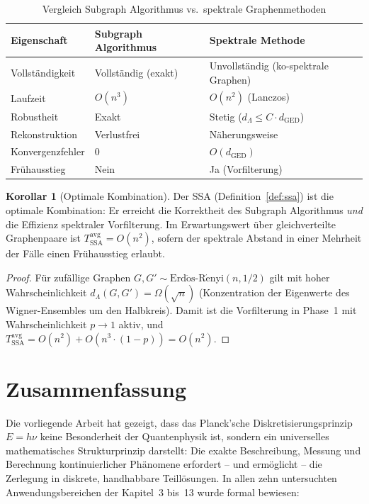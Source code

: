 ﻿\documentclass[a4paper,12pt]{article}
\theoremstyle{definition}
\newtheorem{korollar}{Korollar}
\begin{document}
\begin{table}[ht]
\centering
\begin{tabular}{lll}
\toprule
\textbf{Eigenschaft} & \textbf{Subgraph Algorithmus} & \textbf{Spektrale Methode}\\
\midrule
Vollständigkeit & Vollständig (exakt) & Unvollständig (ko-spektrale Graphen)\\
Laufzeit & $O(n^3)$ & $O(n^2)$ (Lanczos)\\
Robustheit & Exakt & Stetig ($d_\Lambda \leq C \cdot d_{\mathrm{GED}}$)\\
Rekonstruktion & Verlustfrei & Näherungsweise\\
Konvergenzfehler & 0 & $O(d_{\mathrm{GED}})$\\
Frühausstieg & Nein & Ja (Vorfilterung)\\
\bottomrule
\end{tabular}
\caption{Vergleich Subgraph Algorithmus vs.\ spektrale Graphenmethoden}
\end{table}

\begin{korollar}[Optimale Kombination]
\label{kor:opt}
    Der SSA (Definition~\ref{def:ssa}) ist die optimale Kombination:
    Er erreicht die Korrektheit des Subgraph Algorithmus \emph{und} die Effizienz
    spektraler Vorfilterung. Im Erwartungswert über gleichverteilte Graphenpaare ist
    $T_{\mathrm{SSA}}^{\mathrm{avg}} = O(n^2)$, sofern der spektrale Abstand in einer Mehrheit
    der Fälle einen Frühausstieg erlaubt.
\end{korollar}

\begin{proof}
    Für zufällige Graphen $G, G' \sim \mathrm{Erd\ddot{o}s\text{-}R\acute{e}nyi}(n, 1/2)$
    gilt mit hoher Wahrscheinlichkeit $d_\Lambda(G, G') = \Omega(\sqrt{n})$
    (Konzentration der Eigenwerte des Wigner-Ensembles um den Halbkreis).
    Damit ist die Vorfilterung in Phase~1 mit Wahrscheinlichkeit $p \to 1$ aktiv,
    und $T_{\mathrm{SSA}}^{\mathrm{avg}} = O(n^2) + O(n^3 \cdot (1-p)) = O(n^2)$. \qedhere
\end{proof}

\section{Zusammenfassung}

Die vorliegende Arbeit hat gezeigt, dass das Planck'sche Diskretisierungsprinzip $E = h\nu$ keine Besonderheit der Quantenphysik ist, sondern ein universelles mathematisches Strukturprinzip darstellt: Die exakte Beschreibung, Messung und Berechnung kontinuierlicher Phänomene erfordert -- und ermöglicht -- die Zerlegung in diskrete, handhabbare Teillösungen. In allen zehn untersuchten Anwendungsbereichen der Kapitel~3 bis~13 wurde formal bewiesen:
\end{document}
